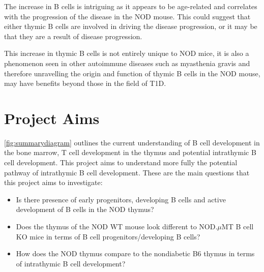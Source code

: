 


The increase in B cells is intriguing as it appears to be age-related and correlates with the progression of the disease in the NOD mouse.
This could suggest that either thymic B cells are involved in driving the disease progression, or it may be that they are a result of disease progression.

This increase in thymic B cells is not entirely unique to NOD mice, it is also a phenomenon seen in other autoimmune diseases such as myasthenia gravis \citep{Vrolix2014, Christensson1988} and therefore unravelling the origin and function of thymic B cells in the NOD mouse, may have benefits beyond those in the field of T1D.


\section{Project Aims}

\cref{fig:summarydiagram} outlines the current understanding of B cell development in the bone marrow, T cell development in the thymus and potential intrathymic B cell development.
This project aims to understand more fully the potential pathway of intrathymic B cell development.
These are the main questions that this project aims to investigate:
\begin{itemize}
\item Is there presence of early progenitors, developing B cells and active development of B cells in the NOD thymus?
\item Does the thymus of the NOD WT mouse look different to NOD.$\mu$MT B cell KO mice in terms of B cell progenitors/developing B cells?
\item How does the NOD thymus compare to the nondiabetic B6 thymus in terms of intrathymic B cell development?
\end{itemize}

